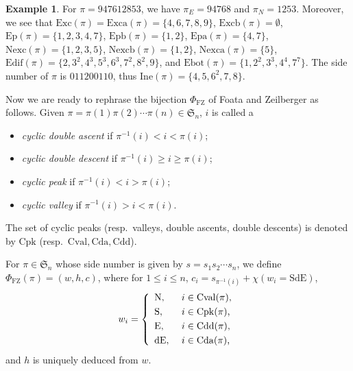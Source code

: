 \documentclass[12pt]{amsart}
\numberwithin{equation}{section}
\theoremstyle{plain}
\theoremstyle{definition}
\newtheorem{example}[theorem]{Example}
\def\FZ{\mathrm{FZ}}
\def\SS{\mathfrak{S}}
\def\N{\mathrm{N}}
\def\S{\mathrm{S}}
\def\E{\mathrm{E}}
\def\dE{\mathrm{dE}}
\def\SdE{\mathrm{SdE}}
\def\Edif{\mathrm{Edif}}
\def\Excp{\mathrm{Ep}}
\def\Exc{\mathrm{Exc}}
\def\Nexc{\mathrm{Nexc}}
\def\Excpb{\mathrm{Epb}}
\def\Excpa{\mathrm{Epa}}
\def\Nexcb{\mathrm{Nexcb}}
\def\Nexca{\mathrm{Nexca}}
\def\Excb{\mathrm{Excb}}
\def\Exca{\mathrm{Exca}}
\def\Ine{\mathrm{Ine}}
\def\Ebot{\mathrm{Ebot}}
\def\Cpk{\mathrm{Cpk}}
\def\Cval{\mathrm{Cval}}
\def\Cda{\mathrm{Cda}}
\def\Cdd{\mathrm{Cdd}}
\def\cpk{\mathrm{cpk}}
\def\cval{\mathrm{cval}}
\def\cda{\mathrm{cda}}
\def\cdd{\mathrm{cdd}}
\begin{document}
\begin{example}
For $\pi=947612853$, we have $\pi_E=9 4 7 6 8$ and $\pi_N=1 2 5 3$. Moreover, we see that $\Exc(\pi)=\Exca(\pi)=\{4,6,7,8,9\}$, $\Excb(\pi)=\emptyset$,
$\Excp(\pi)=\{1,2,3,4,7\}$, $\Excpb(\pi)=\{1,2\}$,
$\Excpa(\pi)=\{4,7\}$,
$\Nexc(\pi)=\{1,2,3,5\}$,
$\Nexcb(\pi)=\{1,2\}$,
$\Nexca(\pi)=\{5\}$,
$\Edif(\pi)=\{2,3^2,4^3,5^3,6^3,7^2,8^2,9\}$, and
$\Ebot(\pi)=\{1,2^2,3^3,4^4,7^7\}$. The side number of $\pi$ is $011200110$, thus $\Ine(\pi)=\{4,5,6^2,7,8\}$.
\end{example}

Now we are ready to rephrase the bijection $\Phi_{\FZ}$ of
Foata and Zeilberger as follows. Given $\pi=\pi(1) \pi(2) \cdots \pi(n) \in \SS_n$,  $i$ is called a
\begin{itemize}
  \item {\em cyclic double ascent} if $\pi^{-1}(i) < i <\pi(i)$;
  \item {\em cyclic double descent} if $\pi^{-1}(i) \geq  i \geq \pi(i)$;
  \item {\em cyclic peak} if $\pi^{-1}(i) < i >\pi(i)$;
  \item {\em cyclic valley} if $\pi^{-1}(i) > i <\pi(i)$.
\end{itemize}
The set of cyclic peaks (resp.~valleys, double ascents, double descents) is denoted by $\Cpk$ (resp.~$\Cval, \Cda, \Cdd$).


For $\pi \in \SS_n$ whose side number is given by $s=s_1 s_2 \cdots s_n$, we define $\Phi_{\FZ}(\pi)=(w,h,c)$, where for $1\le i\le n$, $c_{i}=s_{\pi^{-1}(i)}+\chi(w_{i}=\SdE)$,
\begin{equation*}
w_i= \left\{
  \begin{array}{ll}
\N, & \mbox{ $ i \in \Cval(\pi)$,}\\[3pt]
\S, & \mbox{  $ i \in \Cpk(\pi)$,} \\[3pt]
\E, & \mbox{  $ i \in \Cdd(\pi)$,}\\[3pt]
\dE, & \mbox{  $ i \in \Cda(\pi)$,}
 \end{array} \right.
\end{equation*}
and $h$ is uniquely deduced from $w$.
\end{document}
